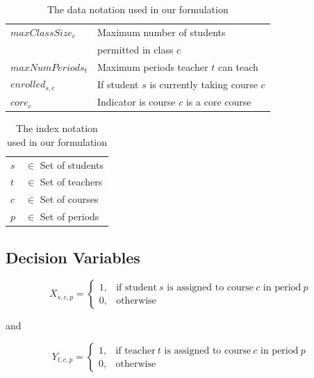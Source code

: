 \documentclass[12pt]{article}
\begin{document}
\begin{table}[]
\centering
\caption{The data notation used in our formulation}
\label{tab:data-notation}
\begin{tabular}{ll}
\hline
$maxClassSize_{c}$ & Maximum number of students \\
 & permitted in class $c$ \\
$maxNumPeriods_{t}$ & Maximum periods teacher $t$ can teach\\
$enrolled_{s,c}$ & If student $s$ is currently taking course $c$\\
$core_{c}$ & Indicator is course $c$ is a core course \\
\hline
\end{tabular}
\end{table}


\begin{table}[]
\centering
\caption{The index notation used in our formulation}
\label{tab:index-notation}
\begin{tabular}{ll}
\hline
$s$ & $\in$ Set of students \\
$t$ & $\in$ Set of teachers \\
$c$ & $\in$ Set of courses \\
$p$ & $\in$ Set of periods \\
\hline
\end{tabular}
\end{table}


\subsection{Decision Variables}

\begin{equation}
	X_{s,c,p} = 
	\begin{cases}
		1, & \text{if student}\ s \text{ is assigned to course}\ c \text{ in period}\ p	\\
		0, & \text{otherwise}
	\end{cases}
\end{equation}

and

\begin{equation}
	Y_{t,c,p} = 
	\begin{cases}
		1, & \text{if teacher}\ t \text{ is assigned to course}\ c \text{ in period}\ p	\\
		0, & \text{otherwise}
	\end{cases}
\end{equation}
\end{document}
